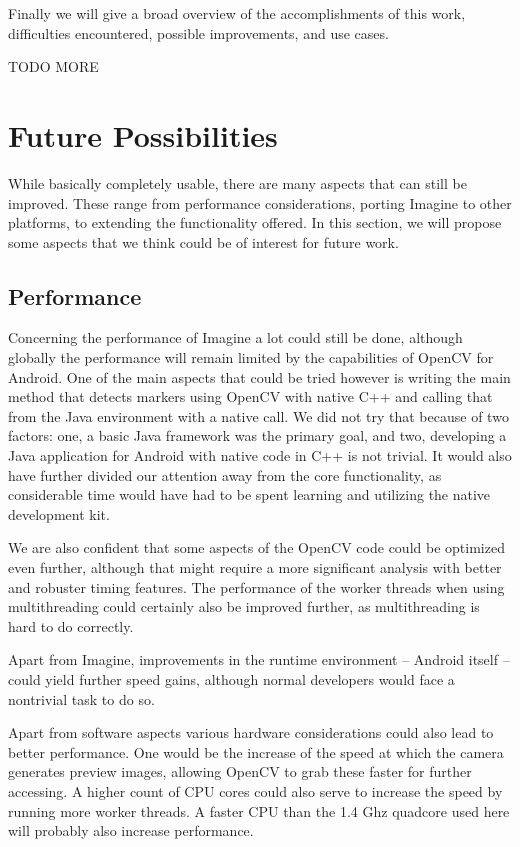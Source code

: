 Finally we will give a broad overview of the accomplishments of this work, difficulties encountered, possible improvements, and use cases.

TODO MORE

\section{Future Possibilities}

While basically completely usable, there are many aspects that can still be improved.
These range from performance considerations, porting Imagine to other platforms, to extending the functionality offered.
In this section, we will propose some aspects that we think could be of interest for future work.

\subsection{Performance}

Concerning the performance of Imagine a lot could still be done, although globally the performance will remain limited by the capabilities of OpenCV for Android.
One of the main aspects that could be tried however is writing the main method that detects markers using OpenCV with native C++ and calling that from the Java environment with a native call.
We did not try that because of two factors: one, a basic Java framework was the primary goal, and two, developing a Java application for Android with native code in C++ is not trivial.
It would also have further divided our attention away from the core functionality, as considerable time would have had to be spent learning and utilizing the native development kit.

We are also confident that some aspects of the OpenCV code could be optimized even further, although that might require a more significant analysis with better and robuster timing features.
The performance of the worker threads when using multithreading could certainly also be improved further, as multithreading is hard to do correctly.

Apart from Imagine, improvements in the runtime environment – Android itself – could yield further speed gains, although normal developers would face a nontrivial task to do so.

Apart from software aspects various hardware considerations could also lead to better performance.
One would be the increase of the speed at which the camera generates preview images, allowing OpenCV to grab these faster for further accessing.
A higher count of CPU cores could also serve to increase the speed by running more worker threads.
A faster CPU than the 1.4 Ghz quadcore used here will probably also increase performance.

